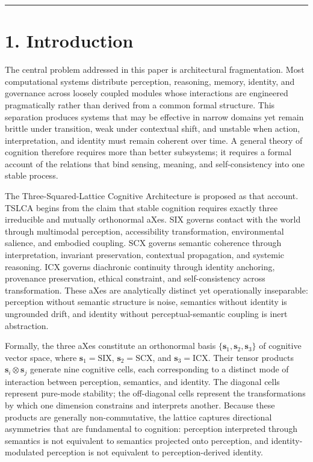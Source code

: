 \begin{center}\rule{0.5\linewidth}{0.5pt}\end{center}

\section{1. Introduction}\label{introduction}

The central problem addressed in this paper is architectural fragmentation. Most computational systems distribute perception, reasoning, memory, identity, and governance across loosely coupled modules whose interactions are engineered pragmatically rather than derived from a common formal structure. This separation produces systems that may be effective in narrow domains yet remain brittle under transition, weak under contextual shift, and unstable when action, interpretation, and identity must remain coherent over time. A general theory of cognition therefore requires more than better subsystems; it requires a formal account of the relations that bind sensing, meaning, and self-consistency into one stable process.

The Three-Squared-Lattice Cognitive Architecture is proposed as that account. TSLCA begins from the claim that stable cognition requires exactly three irreducible and mutually orthonormal aXes. SIX governs contact with the world through multimodal perception, accessibility transformation, environmental salience, and embodied coupling. SCX governs semantic coherence through interpretation, invariant preservation, contextual propagation, and systemic reasoning. ICX governs diachronic continuity through identity anchoring, provenance preservation, ethical constraint, and self-consistency across transformation. These aXes are analytically distinct yet operationally inseparable: perception without semantic structure is noise, semantics without identity is ungrounded drift, and identity without perceptual-semantic coupling is inert abstraction.

Formally, the three aXes constitute an orthonormal basis \(\{\mathbf{s}_1, \mathbf{s}_2, \mathbf{s}_3\}\) of cognitive vector space, where \(\mathbf{s}_1 = \mathrm{SIX}\), \(\mathbf{s}_2 = \mathrm{SCX}\), and \(\mathbf{s}_3 = \mathrm{ICX}\). Their tensor products \(\mathbf{s}_i \otimes
\mathbf{s}_j\) generate nine cognitive cells, each corresponding to a distinct mode of interaction between perception, semantics, and identity. The diagonal cells represent pure-mode stability; the off-diagonal cells represent the transformations by which one dimension constrains and interprets another. Because these products are generally non-commutative, the lattice captures directional asymmetries that are fundamental to cognition: perception interpreted through semantics is not equivalent to semantics projected onto perception, and identity-modulated perception is not equivalent to perception-derived identity.

